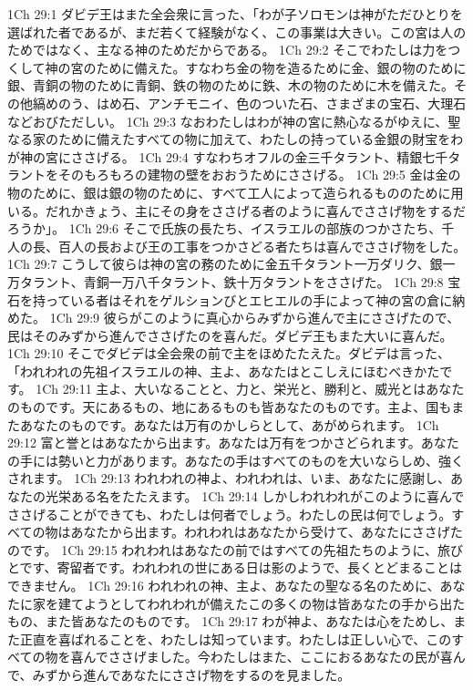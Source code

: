 1Ch 29:1  ダビデ王はまた全会衆に言った、「わが子ソロモンは神がただひとりを選ばれた者であるが、まだ若くて経験がなく、この事業は大きい。この宮は人のためではなく、主なる神のためだからである。
1Ch 29:2  そこでわたしは力をつくして神の宮のために備えた。すなわち金の物を造るために金、銀の物のために銀、青銅の物のために青銅、鉄の物のために鉄、木の物のために木を備えた。その他縞めのう、はめ石、アンチモニイ、色のついた石、さまざまの宝石、大理石などおびただしい。
1Ch 29:3  なおわたしはわが神の宮に熱心なるがゆえに、聖なる家のために備えたすべての物に加えて、わたしの持っている金銀の財宝をわが神の宮にささげる。
1Ch 29:4  すなわちオフルの金三千タラント、精銀七千タラントをそのもろもろの建物の壁をおおうためにささげる。
1Ch 29:5  金は金の物のために、銀は銀の物のために、すべて工人によって造られるもののために用いる。だれかきょう、主にその身をささげる者のように喜んでささげ物をするだろうか」。
1Ch 29:6  そこで氏族の長たち、イスラエルの部族のつかさたち、千人の長、百人の長および王の工事をつかさどる者たちは喜んでささげ物をした。
1Ch 29:7  こうして彼らは神の宮の務のために金五千タラント一万ダリク、銀一万タラント、青銅一万八千タラント、鉄十万タラントをささげた。
1Ch 29:8  宝石を持っている者はそれをゲルションびとエヒエルの手によって神の宮の倉に納めた。
1Ch 29:9  彼らがこのように真心からみずから進んで主にささげたので、民はそのみずから進んでささげたのを喜んだ。ダビデ王もまた大いに喜んだ。
1Ch 29:10  そこでダビデは全会衆の前で主をほめたたえた。ダビデは言った、「われわれの先祖イスラエルの神、主よ、あなたはとこしえにほむべきかたです。
1Ch 29:11  主よ、大いなることと、力と、栄光と、勝利と、威光とはあなたのものです。天にあるもの、地にあるものも皆あなたのものです。主よ、国もまたあなたのものです。あなたは万有のかしらとして、あがめられます。
1Ch 29:12  富と誉とはあなたから出ます。あなたは万有をつかさどられます。あなたの手には勢いと力があります。あなたの手はすべてのものを大いならしめ、強くされます。
1Ch 29:13  われわれの神よ、われわれは、いま、あなたに感謝し、あなたの光栄ある名をたたえます。
1Ch 29:14  しかしわれわれがこのように喜んでささげることができても、わたしは何者でしょう。わたしの民は何でしょう。すべての物はあなたから出ます。われわれはあなたから受けて、あなたにささげたのです。
1Ch 29:15  われわれはあなたの前ではすべての先祖たちのように、旅びとです、寄留者です。われわれの世にある日は影のようで、長くとどまることはできません。
1Ch 29:16  われわれの神、主よ、あなたの聖なる名のために、あなたに家を建てようとしてわれわれが備えたこの多くの物は皆あなたの手から出たもの、また皆あなたのものです。
1Ch 29:17  わが神よ、あなたは心をためし、また正直を喜ばれることを、わたしは知っています。わたしは正しい心で、このすべての物を喜んでささげました。今わたしはまた、ここにおるあなたの民が喜んで、みずから進んであなたにささげ物をするのを見ました。
